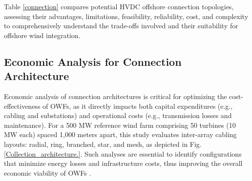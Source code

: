 \documentclass{ieeeaccess}
\begin{document}
Table \ref{connection} compares potential HVDC offshore connection topologies, assessing their advantages, limitations, feasibility, reliability, cost, and complexity to comprehensively understand the trade-offs involved and their suitability for offshore wind integration.



\subsection{\textbf{Economic Analysis for Connection Architecture}}
Economic analysis of connection architectures is critical for optimizing the cost-effectiveness of OWFs, as it directly impacts both capital expenditures (e.g., cabling and substations) and operational costs (e.g., transmission losses and maintenance). For a 500 MW reference wind farm comprising 50 turbines (10 MW each) spaced 1,000 meters apart, this study evaluates inter-array cabling layouts: radial, ring, branched, star, and mesh, as depicted in Fig. \ref{Collection_architecture.}. Such analyses are essential to identify configurations that minimize energy losses and infrastructure costs, thus improving the overall economic viability of OWFs \cite{stamatiou2010techno,van2010economic}.
\end{document}
